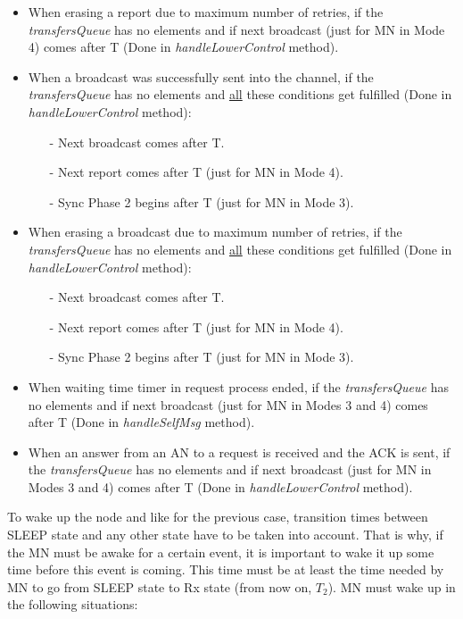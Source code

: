 \begin{itemize}
  \item When erasing a report due to maximum number of retries, if the \textit{transfersQueue} has no elements and if next broadcast (just for 
  \ac{MN} in Mode 4) comes after T (Done in \textit{handleLowerControl} method).

  \item When a broadcast was successfully sent into the channel, if the \textit{transfersQueue} has no elements and \underline{all} these 
  conditions get fulfilled (Done in \textit{handleLowerControl} method):
    \begin{itemize}
      \item[-] Next broadcast comes after T.
      \item[-] Next report comes after T (just for \ac{MN} in Mode 4).
      \item[-] Sync Phase 2 begins after T (just for \ac{MN} in Mode 3).
    \end{itemize}

  \item When erasing a broadcast due to maximum number of retries, if the \textit{transfersQueue} has no elements and \underline{all} these 
  conditions get fulfilled (Done in \textit{handleLowerControl} method):
    \begin{itemize}
      \item[-] Next broadcast comes after T.
      \item[-] Next report comes after T (just for \ac{MN} in Mode 4).
      \item[-] Sync Phase 2 begins after T (just for \ac{MN} in Mode 3).
    \end{itemize}

  \item When waiting time timer in request process ended, if the \textit{transfersQueue} has no elements and if next broadcast (just for \ac{MN} in 
  Modes 3 and 4) comes after T (Done in \textit{handleSelfMsg} method).

  \item When an answer from an \ac{AN} to a request is received and the \ac{ACK} is sent, if the \textit{transfersQueue} has no elements and 
  if next broadcast (just for \ac{MN} in Modes 3 and 4) comes after T (Done in \textit{handleLowerControl} method).
\end{itemize}

To wake up the node and like for the previous case, transition times between SLEEP state and any other state have to be taken into account. That 
is why, if the \ac{MN} must be awake for a certain event, it is important to wake it up some time before this event is coming. This time must be 
at least the time needed by \ac{MN} to go from SLEEP state to \ac{Rx} state (from now on, $T_2$). \ac{MN} must wake up in the following situations:

